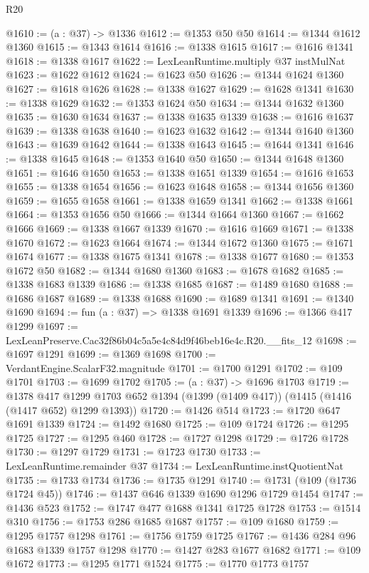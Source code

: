 \begin{lexlean}{R20}
\begin{coremodule}
@1610 := (a : @37) -> @1336
@1612 := @1353 @50 @50
@1614 := @1344 @1612 @1360
@1615 := @1343 @1614
@1616 := @1338 @1615
@1617 := @1616 @1341
@1618 := @1338 @1617
@1622 := LexLeanRuntime.multiply @37 instMulNat
@1623 := @1622 @1612
@1624 := @1623 @50
@1626 := @1344 @1624 @1360
@1627 := @1618 @1626
@1628 := @1338 @1627
@1629 := @1628 @1341
@1630 := @1338 @1629
@1632 := @1353 @1624 @50
@1634 := @1344 @1632 @1360
@1635 := @1630 @1634
@1637 := @1338 @1635 @1339
@1638 := @1616 @1637
@1639 := @1338 @1638
@1640 := @1623 @1632
@1642 := @1344 @1640 @1360
@1643 := @1639 @1642
@1644 := @1338 @1643
@1645 := @1644 @1341
@1646 := @1338 @1645
@1648 := @1353 @1640 @50
@1650 := @1344 @1648 @1360
@1651 := @1646 @1650
@1653 := @1338 @1651 @1339
@1654 := @1616 @1653
@1655 := @1338 @1654
@1656 := @1623 @1648
@1658 := @1344 @1656 @1360
@1659 := @1655 @1658
@1661 := @1338 @1659 @1341
@1662 := @1338 @1661
@1664 := @1353 @1656 @50
@1666 := @1344 @1664 @1360
@1667 := @1662 @1666
@1669 := @1338 @1667 @1339
@1670 := @1616 @1669
@1671 := @1338 @1670
@1672 := @1623 @1664
@1674 := @1344 @1672 @1360
@1675 := @1671 @1674
@1677 := @1338 @1675 @1341
@1678 := @1338 @1677
@1680 := @1353 @1672 @50
@1682 := @1344 @1680 @1360
@1683 := @1678 @1682
@1685 := @1338 @1683 @1339
@1686 := @1338 @1685
@1687 := @1489 @1680
@1688 := @1686 @1687
@1689 := @1338 @1688
@1690 := @1689 @1341
@1691 := @1340 @1690
@1694 := fun (a : @37) => @1338 @1691 @1339
@1696 := @1366 @417 @1299
@1697 := LexLeanPreserve.Cac32f86b04c5a5e4c84d9f46beb16e4c.R20.__fits_12
@1698 := @1697 @1291
@1699 := @1369 @1698
@1700 := VerdantEngine.ScalarF32.magnitude
@1701 := @1700 @1291
@1702 := @109 @1701
@1703 := @1699 @1702
@1705 := (a : @37) -> @1696 @1703
@1719 := @1378
    @417
    @1299
    @1703
    @652
    @1394
    (@1399 (@1409 @417))
    (@1415 (@1416 (@1417 @652) @1299 @1393))
@1720 := @1426 @514
@1723 := @1720 @647 @1691 @1339
@1724 := @1492 @1680
@1725 := @109 @1724
@1726 := @1295 @1725
@1727 := @1295 @460
@1728 := @1727 @1298
@1729 := @1726 @1728
@1730 := @1297 @1729
@1731 := @1723 @1730
@1733 := LexLeanRuntime.remainder @37
@1734 := LexLeanRuntime.instQuotientNat
@1735 := @1733 @1734
@1736 := @1735 @1291
@1740 := @1731 (@109 (@1736 @1724 @45))
@1746 := @1437 @646 @1339 @1690 @1296 @1729 @1454
@1747 := @1436 @523
@1752 := @1747 @477 @1688 @1341 @1725 @1728
@1753 := @1514 @310
@1756 := @1753 @286 @1685 @1687
@1757 := @109 @1680
@1759 := @1295 @1757 @1298
@1761 := @1756 @1759 @1725
@1767 := @1436 @284 @96 @1683 @1339 @1757 @1298
@1770 := @1427 @283 @1677 @1682
@1771 := @109 @1672
@1773 := @1295 @1771 @1524
@1775 := @1770 @1773 @1757

\end{coremodule}
\end{lexlean}
